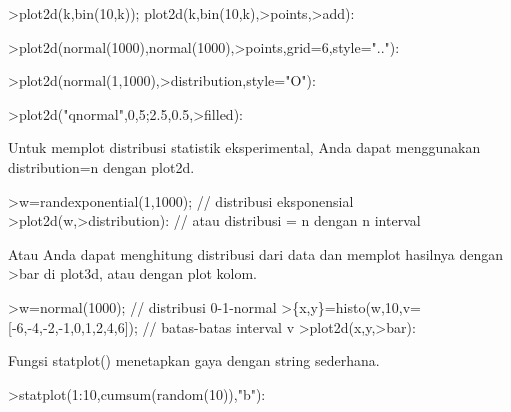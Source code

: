 \documentclass{article}
\begin{document}
\begin{eulernotebook}
\begin{eulercomment}
\begin{eulercomment}
\begin{eulercomment}
\begin{eulercomment}
\begin{eulercomment}
\begin{eulercomment}
\begin{eulercomment}
\begin{eulercomment}
\begin{eulerprompt}
>plot2d(k,bin(10,k)); plot2d(k,bin(10,k),>points,>add):
\end{eulerprompt}
\begin{eulerprompt}
>plot2d(normal(1000),normal(1000),>points,grid=6,style=".."):
\end{eulerprompt}
\begin{eulerprompt}
>plot2d(normal(1,1000),>distribution,style="O"):
\end{eulerprompt}
\begin{eulerprompt}
>plot2d("qnormal",0,5;2.5,0.5,>filled):
\end{eulerprompt}
\begin{eulercomment}
Untuk memplot distribusi statistik eksperimental, Anda dapat
menggunakan distribution=n dengan plot2d.
\end{eulercomment}
\begin{eulerprompt}
>w=randexponential(1,1000); // distribusi eksponensial
>plot2d(w,>distribution): // atau distribusi = n dengan n interval
\end{eulerprompt}
\begin{eulercomment}
Atau Anda dapat menghitung distribusi dari data dan memplot hasilnya
dengan \textgreater{}bar di plot3d, atau dengan plot kolom.
\end{eulercomment}
\begin{eulerprompt}
>w=normal(1000); // distribusi 0-1-normal 
>\{x,y\}=histo(w,10,v=[-6,-4,-2,-1,0,1,2,4,6]); // batas-batas interval v
>plot2d(x,y,>bar):
\end{eulerprompt}
\begin{eulercomment}
Fungsi statplot() menetapkan gaya dengan string sederhana.
\end{eulercomment}
\begin{eulerprompt}
>statplot(1:10,cumsum(random(10)),"b"):
\end{eulerprompt}
\begin{eulerprompt}

\end{eulerprompt}
\end{eulercomment}
\end{eulercomment}
\end{eulercomment}
\end{eulercomment}
\end{eulercomment}
\end{eulercomment}
\end{eulercomment}
\end{eulercomment}
\end{eulernotebook}
\end{document}
